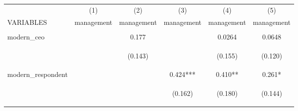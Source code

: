\begin{center}
\begin{tabular}{lccccc} \hline
 & (1) & (2) & (3) & (4) & (5) \\
VARIABLES & management & management & management & management & management \\ \hline
\vspace{4pt} & \begin{footnotesize}\end{footnotesize} & \begin{footnotesize}\end{footnotesize} & \begin{footnotesize}\end{footnotesize} & \begin{footnotesize}\end{footnotesize} & \begin{footnotesize}\end{footnotesize} \\
modern\_ceo &  & 0.177 &  & 0.0264 & 0.0648 \\
\vspace{4pt} & \begin{footnotesize}\end{footnotesize} & \begin{footnotesize}(0.143)\end{footnotesize} & \begin{footnotesize}\end{footnotesize} & \begin{footnotesize}(0.155)\end{footnotesize} & \begin{footnotesize}(0.120)\end{footnotesize} \\
modern\_respondent &  &  & 0.424*** & 0.410** & 0.261* \\
\vspace{4pt} & \begin{footnotesize}\end{footnotesize} & \begin{footnotesize}\end{footnotesize} & \begin{footnotesize}(0.162)\end{footnotesize} & \begin{footnotesize}(0.180)\end{footnotesize} & \begin{footnotesize}(0.144)\end{footnotesize} \\

\end{tabular}
\end{center}
